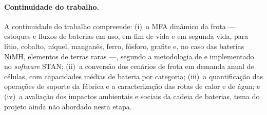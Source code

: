 \paragraph{Continuidade do trabalho.}
A continuidade do trabalho compreende: (i)~o MFA dinâmico da frota — estoques e
fluxos de baterias em uso, em fim de vida e em segunda vida, para lítio, cobalto,
níquel, manganês, ferro, fósforo, grafite e, no caso das baterias NiMH, elementos
de terras raras —, segundo a metodologia de  e
implementado no \textit{software} STAN; (ii)~a conversão dos cenários de frota em
demanda anual de células, com capacidades médias de bateria por categoria;
(iii)~a quantificação das operações de suporte da fábrica e a caracterização das
rotas de calor e de água; e (iv)~a avaliação dos impactos ambientais e sociais da
cadeia de baterias, tema do projeto ainda não abordado nesta etapa.
